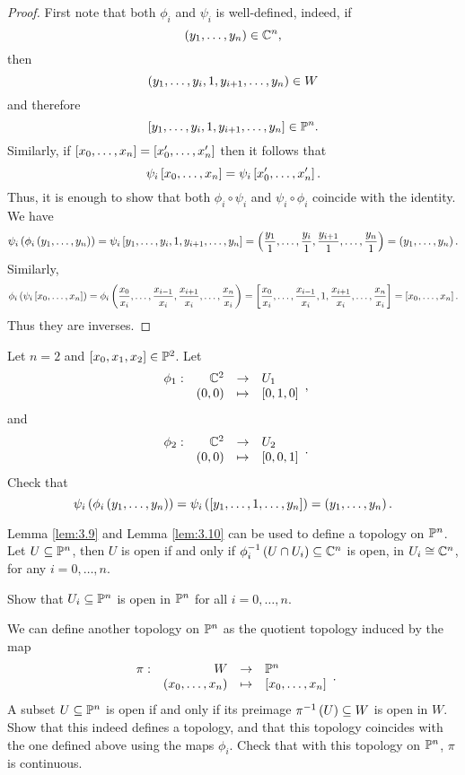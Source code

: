 \begin{proof}
First note that both $ \phi_i $ and $ \psi_i $ is well-defined, indeed, if
$$ \rb{y_1, \dots, y_n} \in \C^n, $$
then
$$ \rb{y_1, \dots, y_i, 1, y_{i + 1}, \dots, y_n} \in W $$
and therefore
$$ \sb{y_1, \dots, y_i, 1, y_{i + 1}, \dots, y_n} \in \P^n. $$
Similarly, if $ \sb{x_0, \dots, x_n} = \sb{x_0', \dots, x_n'} $ then it follows that
$$ \psi_i\sb{x_0, \dots, x_n} = \psi_i\sb{x_0', \dots, x_n'}. $$
Thus, it is enough to show that both $ \phi_i \circ \psi_i $ and $ \psi_i \circ \phi_i $ coincide with the identity. We have
$$ \psi_i\rb{\phi_i\rb{y_1, \dots, y_n}} = \psi_i\sb{y_1, \dots, y_i, 1, y_{i + 1}, \dots, y_n} = \rb{\dfrac{y_1}{1}, \dots, \dfrac{y_i}{1}, \dfrac{y_{i + 1}}{1}, \dots, \dfrac{y_n}{1}} = \rb{y_1, \dots, y_n}. $$
Similarly,
$$ \phi_i\rb{\psi_i\sb{x_0, \dots, x_n}} = \phi_i\rb{\dfrac{x_0}{x_i}, \dots, \dfrac{x_{i - 1}}{x_i}, \dfrac{x_{i + 1}}{x_i}, \dots, \dfrac{x_n}{x_i}} = \sb{\dfrac{x_0}{x_i}, \dots, \dfrac{x_{i - 1}}{x_i}, 1, \dfrac{x_{i + 1}}{x_i}, \dots, \dfrac{x_n}{x_i}} = \sb{x_0, \dots, x_n}. $$
Thus they are inverses.
\end{proof}

\begin{example*}
Let $ n = 2 $ and $ \sb{x_0, x_1, x_2} \in \P^2 $. Let
$$ \function[\phi_1]{\C^2}{U_1}{\rb{0, 0}}{\sb{0, 1, 0}}, $$
and
$$ \function[\phi_2]{\C^2}{U_2}{\rb{0, 0}}{\sb{0, 0, 1}}. $$
Check that
$$ \psi_i\rb{\phi_i\rb{y_1, \dots, y_n}} = \psi_i\rb{\sb{y_1, \dots, 1, \dots, y_n}} = \rb{y_1, \dots, y_n}. $$
\end{example*}

Lemma \ref{lem:3.9} and Lemma \ref{lem:3.10} can be used to define a topology on $ \P^n $. Let $ U \subseteq \P^n $, then $ U $ is open if and only if $ \phi_i^{-1}\rb{U \cap U_i} \subseteq \C^n $ is open, in $ U_i \cong \C^n $, for any $ i = 0, \dots, n $.

\begin{exercise}
Show that $ U_i \subseteq \P^n $ is open in $ \P^n $ for all $ i = 0, \dots, n $.
\end{exercise}

\begin{exercise}
\label{ex:11}
We can define another topology on $ \P^n $ as the quotient topology induced by the map
$$ \function[\pi]{W}{\P^n}{\rb{x_0, \dots, x_n}}{\sb{x_0, \dots, x_n}}. $$
A subset $ U \subseteq \P^n $ is open if and only if its preimage $ \pi^{-1}\rb{U} \subseteq W $ is open in $ W $. Show that this indeed defines a topology, and that this topology coincides with the one defined above using the maps $ \phi_i $. Check that with this topology on $ \P^n $, $ \pi $ is continuous.
\end{exercise}

